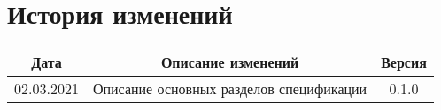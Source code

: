 \chapter*{История изменений}

\begin{center}
    \begin{tabular}{|c|c|c|}
        \hline
	    Дата & Описание изменений & Версия\\
        \hline
        02.03.2021 & Описание основных разделов спецификации & 0.1.0 \\
        \hline
    \end{tabular}
\end{center}